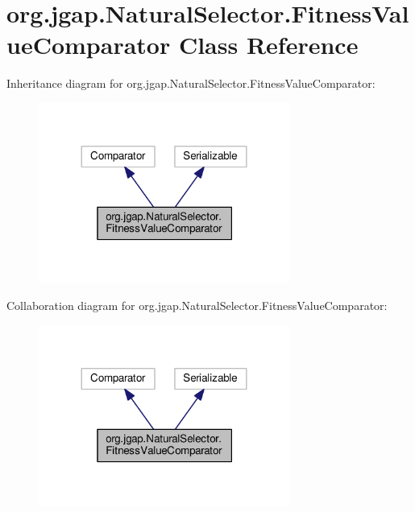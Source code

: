 \hypertarget{classorg_1_1jgap_1_1_natural_selector_1_1_fitness_value_comparator}{\section{org.\-jgap.\-Natural\-Selector.\-Fitness\-Value\-Comparator Class Reference}
\label{classorg_1_1jgap_1_1_natural_selector_1_1_fitness_value_comparator}
}


Inheritance diagram for org.\-jgap.\-Natural\-Selector.\-Fitness\-Value\-Comparator\-:
\nopagebreak
\begin{figure}[H]
\begin{center}
\leavevmode
\includegraphics[width=233pt]{classorg_1_1jgap_1_1_natural_selector_1_1_fitness_value_comparator__inherit__graph}
\end{center}
\end{figure}


Collaboration diagram for org.\-jgap.\-Natural\-Selector.\-Fitness\-Value\-Comparator\-:
\nopagebreak
\begin{figure}[H]
\begin{center}
\leavevmode
\includegraphics[width=233pt]{classorg_1_1jgap_1_1_natural_selector_1_1_fitness_value_comparator__coll__graph}
\end{center}
\end{figure}
